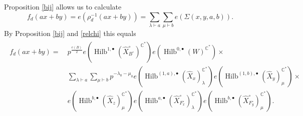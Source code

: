 \documentclass{amsart}
\theoremstyle{definition}
\newcommand{\CC} {\mathbb{C}}          %
\newcommand{\Hilb}{\operatorname{Hilb}}
\begin{document}
Proposition \ref{bij} allows us to calculate 
$$
f_d(ax+by) = e(\rho_{d}^{-1}(ax+by)) = \sum_{\lambda \vdash a} \sum_{\mu \vdash b} e(\Sigma(x,y,a,b)).
$$
By Proposition \ref{bij} and \eqref{relchi} this equals
\begin{align}
\begin{split} \label{fdintermediate}
f_d(ax+by) = \ &p^{\frac{e(B)}{2}} e(\Hilb^{1,\bullet}(\widehat{X}^{\circ}_{B^{\circ}})^{\CC^*}) e(\Hilb^{0,\bullet}(W)^{\CC^*}) \times \\
&\sum_{\lambda \vdash a} \sum_{\mu \vdash b} p^{- \lambda_0 - \mu_0 } e(\Hilb^{(1,a),\bullet}(\widehat{X}_{x})_{\lambda}^{\CC^*}) e(\Hilb^{(1,b),\bullet}(\widehat{X}_{y})_{\mu}^{\CC^*}) \times \\
&e(\Hilb^{b,\bullet}(\widehat{X}_{z})_{\mu}^{\CC^*}) e(\Hilb^{a,\bullet}(\widehat{X}^{\circ}_{F_{x}^{\circ}})_{\lambda}^{\CC^*}) e(\Hilb^{b,\bullet}(\widehat{X}^{\circ}_{F_{y}^{\circ}})_{\mu}^{\CC^*}).
\end{split}
\end{align}
\end{document}

